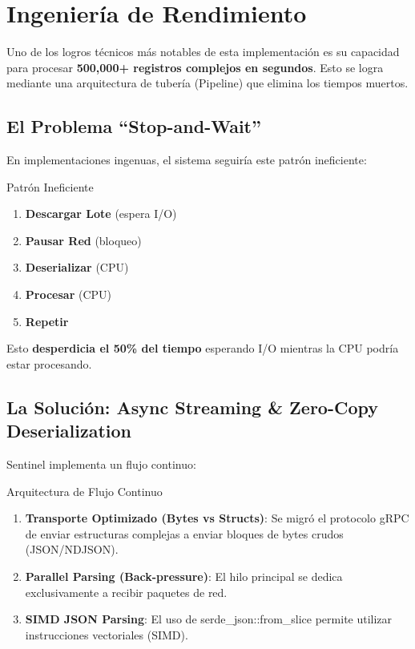 \section{Ingeniería de Rendimiento}

Uno de los logros técnicos más notables de esta implementación es su capacidad para procesar \textbf{500,000+ registros complejos en segundos}. Esto se logra mediante una arquitectura de tubería (Pipeline) que elimina los tiempos muertos.


\subsection{El Problema ``Stop-and-Wait''}

En implementaciones ingenuas, el sistema seguiría este patrón ineficiente:

\begin{caja}{Patrón Ineficiente}
\begin{enumerate}
\item \textbf{Descargar Lote} (espera I/O)
\item \textbf{Pausar Red} (bloqueo)
\item \textbf{Deserializar} (CPU)
\item \textbf{Procesar} (CPU)
\item \textbf{Repetir}
\end{enumerate}
\end{caja}

Esto \textbf{desperdicia el 50\% del tiempo} esperando I/O mientras la CPU podría estar procesando.


\bigskip

\subsection{La Solución: Async Streaming \& Zero-Copy Deserialization}

Sentinel implementa un flujo continuo:

\begin{caja}{Arquitectura de Flujo Continuo}
\begin{enumerate}
\item \textbf{Transporte Optimizado (Bytes vs Structs)}: Se migró el protocolo gRPC de enviar estructuras complejas a enviar bloques de bytes crudos (JSON/NDJSON).
\item \textbf{Parallel Parsing (Back-pressure)}: El hilo principal se dedica exclusivamente a recibir paquetes de red.
\item \textbf{SIMD JSON Parsing}: El uso de serde\_json::from\_slice permite utilizar instrucciones vectoriales (SIMD).
\end{enumerate}
\end{caja}


